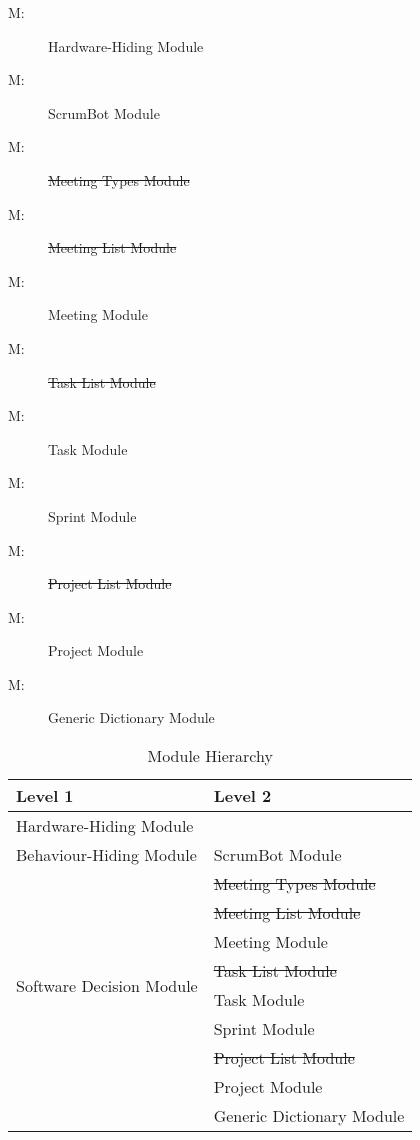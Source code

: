 \documentclass[12pt, titlepage]{article}
\newcounter{mnum}
\newcommand{\mthemnum}{M\themnum}
\begin{document}
\begin{description}
    \item [ \mthemnum \label{m1}:] Hardware-Hiding Module
    \item [ \mthemnum \label{m2}:] ScrumBot Module
    \item [ \mthemnum \label{m3}:] \sout{Meeting Types Module}
    \item [ \mthemnum \label{m4}:] \sout{Meeting List Module}
    \item [ \mthemnum \label{m5}:] Meeting Module
    \item [ \mthemnum \label{m6}:] \sout{Task List Module}
    \item [ \mthemnum \label{m7}:] Task Module
    \item [ \mthemnum \label{m8}:] Sprint Module
    \item [ \mthemnum \label{m9}:] \sout{Project List Module}
    \item [ \mthemnum \label{m10}:] Project Module
    \item [ \mthemnum \label{m11}:] Generic Dictionary Module
\end{description}

\begin{table}[h!]
\centering
\begin{tabular}{p{} p{}}
\toprule
\textbf{Level 1} & \textbf{Level 2}\\
\midrule

{Hardware-Hiding Module} & ~ \\
\midrule

\multirow{1}{0.3\textwidth}{Behaviour-Hiding Module} 
& ScrumBot Module\\         %
\midrule

\multirow{8}{0.3\textwidth}{Software Decision Module} 
& \sout{Meeting Types Module}\\ %
& \sout{Meeting List Module}\\  %
& Meeting Module\\              %
& \sout{Task List Module}\\     %
& Task Module\\                 %
& Sprint Module\\               %
& \sout{Project List Module}\\  %
& Project Module\\              %
& Generic Dictionary Module\\   %
\bottomrule

\end{tabular}
\caption{Module Hierarchy}
\label{TblMH}
\end{table}
\end{document}
